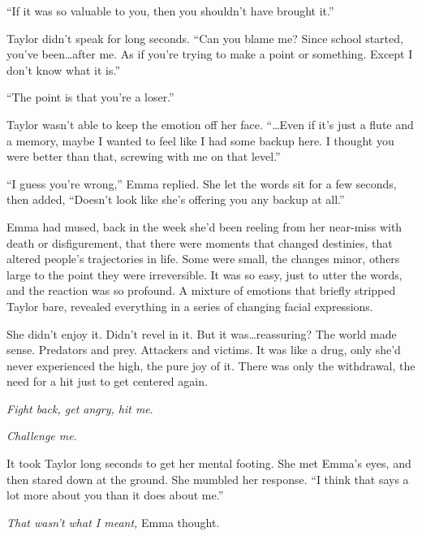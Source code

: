 ``If it was so valuable to you, then you shouldn't have brought it.''



Taylor didn't speak for long seconds.  ``Can you blame me?  Since school started, you've been\ldots after me.  As if you're trying to make a point or something.  Except I don't know what it is.''



``The point is that you're a loser.''



Taylor wasn't able to keep the emotion off her face.  ``\ldots{}Even if it's just a flute and a memory, maybe I wanted to feel like I had some backup here.  I thought you were better than that, screwing with me on that level.''



``I guess you're wrong,'' Emma replied.  She let the words sit for a few seconds, then added, ``Doesn't look like she's offering you any backup at all.''



Emma had mused, back in the week she'd been reeling from her near-miss with death or disfigurement, that there were moments that changed destinies, that altered people's trajectories in life.  Some were small, the changes minor, others large to the point they were irreversible.  It was so easy, just to utter the words, and the reaction was so profound.  A mixture of emotions that briefly stripped Taylor bare, revealed everything in a series of changing facial expressions.



She didn't enjoy it.  Didn't revel in it.  But it was\ldots reassuring?  The world made sense.  Predators and prey.  Attackers and victims.  It was like a drug, only she'd never experienced the high, the pure joy of it.  There was only the withdrawal, the need for a hit just to get centered again.



\emph{Fight back, get angry, hit me}.



\emph{Challenge me}.



It took Taylor long seconds to get her mental footing.  She met Emma's eyes, and then stared down at the ground.  She mumbled her response.  ``I think that says a lot more about you than it does about me.''



\emph{That wasn't what I meant, }Emma thought.



